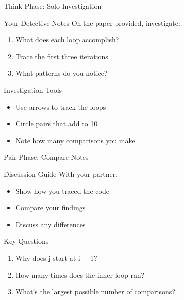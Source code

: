 \documentclass{beamer}
\begin{document}
\begin{frame}{Think Phase: Solo Investigation}
    \begin{block}{Your Detective Notes}
        On the paper provided, investigate:
        \begin{enumerate}
            \item What does each loop accomplish?
            \item Trace the first three iterations
            \item What patterns do you notice?
        \end{enumerate}
    \end{block}
    
    \begin{alertblock}{Investigation Tools}
        \begin{itemize}
            \item Use arrows to track the loops
            \item Circle pairs that add to 10
            \item Note how many comparisons you make
        \end{itemize}
    \end{alertblock}
\end{frame}

\begin{frame}{Pair Phase: Compare Notes}
    \begin{block}{Discussion Guide}
        With your partner:
        \begin{itemize}
            \item Show how you traced the code
            \item Compare your findings
            \item Discuss any differences
        \end{itemize}
    \end{block}
    
    \begin{alertblock}{Key Questions}
        \begin{enumerate}
            \item Why does j start at i + 1?
            \item How many times does the inner loop run?
            \item What's the largest possible number of comparisons?
        \end{enumerate}
    \end{alertblock}
\end{frame}
\end{document}
